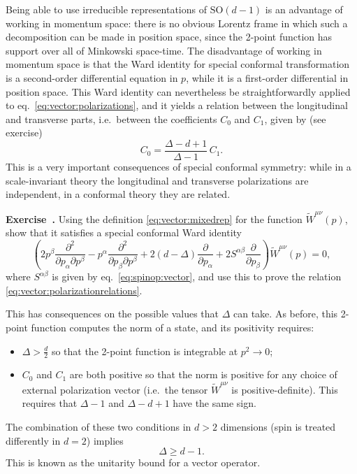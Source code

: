 \documentclass[a4paper,12pt]{article}
\newcommand{\SO}{\text{SO}}
\numberwithin{equation}{section}
\newcounter{exercise}[section]
\newenvironment{exercise}[1][]%
	{\refstepcounter{exercise}\bigskip
	\begin{mdframed}[backgroundcolor=gray!20, linewidth=0]
	\noindent\textbf{Exercise~\thesection.\theexercise #1} \rmfamily}
  	{\end{mdframed}\bigskip}
\begin{document}
Being able to use irreducible representations of $\SO(d-1)$ is an advantage of working in momentum space: there is no obvious Lorentz frame in which such a decomposition can be made in position space, since the 2-point function has support over all of Minkowski space-time. The disadvantage of working in momentum space is that the Ward identity for special conformal transformation is a second-order differential equation in $p$, while it is a first-order differential in position space.
This Ward identity can nevertheless be straightforwardly applied to eq.~\eqref{eq:vector:polarizations}, and it yields a relation between the longitudinal and transverse parts, i.e.~between the coefficients $C_0$ and $C_1$, given by (see exercise)
\begin{equation}
	C_0 = \frac{\Delta - d + 1}{\Delta - 1} \, C_1.
	\label{eq:vector:polarizationrelations}
\end{equation}
This is a very important consequences of special conformal symmetry: 
while in a scale-invariant theory the longitudinal and transverse polarizations are independent, in a conformal theory they are related.
%
\begin{exercise}
	Using the definition \eqref{eq:vector:mixedrep} for the function
	$\widetilde{W}^{\mu\nu}(p)$, show that it satisfies a special
	conformal Ward identity
	$$
	\left( 2 p^\beta
	\frac{\partial^2}{\partial p_\alpha \partial p^\beta}
	- p^\alpha
	\frac{\partial^2}{\partial p_\beta \partial p^\beta}
	+ 2 (d - \Delta) \frac{\partial}{\partial p_\alpha}
	+ 2 S^{\alpha\beta} \frac{\partial}{\partial p_\beta} \right)
	\widetilde{W}^{\mu\nu}(p) = 0,
	$$
	where $S^{\alpha\beta}$ is given by eq.~\eqref{eq:spinop:vector},
	and use this to prove the relation
	\eqref{eq:vector:polarizationrelations}.
\end{exercise}
%
This has consequences on the possible values that $\Delta$ can take. As before, this 2-point function computes the norm of a state, and its positivity requires:
\begin{itemize}

\item
$\Delta > \frac{d}{2}$ so that the 2-point function is integrable at $p^2 \to 0$;

\item
$C_0$ and $C_1$ are both positive so that the norm is positive for any choice of external polarization vector (i.e.~the tensor $\widetilde{W}^{\mu\nu}$ is positive-definite). This requires that $\Delta - 1$ and $\Delta - d + 1$ have the same sign.

\end{itemize}
%
The combination of these two conditions in $d > 2$ dimensions (spin is treated differently in $d = 2$) implies
\begin{equation}
	\Delta \geq d - 1.
\end{equation}
This is known as the unitarity bound for a vector operator.
\end{document}

